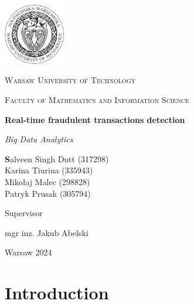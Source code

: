\documentclass[12pt,a4paper, hidelinks]{article}
\begin{document}
\begin{titlepage}
    \centering
    \vspace*{0.5 cm}
    \includegraphics[width=0.20\textwidth]{images/logo.png}\par\vspace{1cm}
    {\scshape\LARGE Warsaw University of Technology \par}
    \vspace{1cm}
    {\scshape\Large Faculty of Mathematics and Information Science\par}
    \vspace{1.5cm}
    {\huge\bfseries Real-time fraudulent transactions detection \par}
    \vspace{1cm}
    {\Large\itshape Big Data Analytics\par}
    \vfill
    \begin{flushright}

    {\Large\textbf Salveen Singh Dutt (317298) \\ Karina Tiurina (335943) \\ Mikołaj Malec (298828) \\ Patryk Prusak (305794) \par}
    \vfill
    {Supervisor\par}
    {\Large mgr inz. Jakub Abelski \par}
    
    \end{flushright}
    \vfill
    {\large Warsaw 2024\par}
    \vspace{1cm}
\end{titlepage}

\newpage

\tableofcontents
\newpage %

\section*{Introduction}
\end{document}
